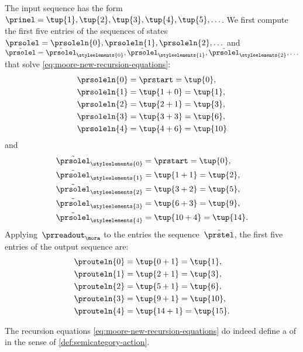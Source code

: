 \begin{example}
    The input sequence has the form~$\prinel = \tup{1}, \tup{2}, \tup{3}, \tup{4}, \tup{5}, \ldots$.
    We first compute the first five entries of the sequences of states~$\prsolel = \prsoleln{0}, \prsoleln{1}, \prsoleln{2}, \ldots$ and~$\tilde{\prsolel} = \tilde{\prsolel}_\styleelements{0}, \tilde{\prsolel}_\styleelements{1}, \tilde{\prsolel}_\styleelements{2}, \ldots$ that solve \cref{eq:moore-new-recursion-equations}:
    \begin{align}
        \prsoleln{0} & = \prstart = \tup{0}, \\
        \prsoleln{1} & = \tup{1 + 0} = \tup{1}, \\
        \prsoleln{2} & = \tup{2 + 1} = \tup{3}, \\
        \prsoleln{3} & = \tup{3 + 3} = \tup{6}, \\
        \prsoleln{4} & = \tup{4 + 6} = \tup{10}
    \end{align}
    and
    \begin{align}
        \tilde{\prsolel}_\styleelements{0} & = \prstart = \tup{0}, \\
        \tilde{\prsolel}_\styleelements{1} & = \tup{1 + 1} = \tup{2}, \\
        \tilde{\prsolel}_\styleelements{2} & = \tup{3 + 2} = \tup{5}, \\
        \tilde{\prsolel}_\styleelements{3} & = \tup{6 + 3} = \tup{9}, \\
        \tilde{\prsolel}_\styleelements{4} & = \tup{10 + 4} = \tup{14}.
    \end{align}
    Applying~$\prreadout_\mora$ to the entries the sequence~$\tilde \prstel$, the first five entries of the output sequence are:
    \begin{align}
        \prouteln{0} & = \tup{0 + 1} = \tup{1}, \\
        \prouteln{1} & = \tup{2 + 1} = \tup{3}, \\
        \prouteln{2} & = \tup{5 + 1} = \tup{6}, \\
        \prouteln{3} & = \tup{9 + 1} = \tup{10}, \\
        \prouteln{4} & = \tup{14 + 1} = \tup{15}.
    \end{align}
\end{example}


\begin{lemma}\label{lem:moore-new-recursion-equations}
    The recursion equations \cref{eq:moore-new-recursion-equations} do indeed define a  of  in the sense of \cref{def:semicategory-action}.
\end{lemma}

